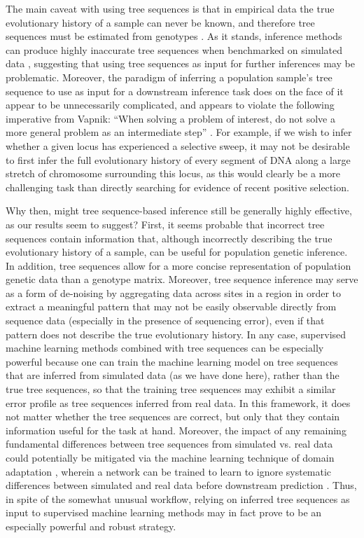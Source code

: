 The main caveat with using tree sequences is that in empirical data the true evolutionary history of a sample can never be known, and therefore tree sequences must be estimated from genotypes \cite{kelleherInferringWholegenomeHistories2019,mahmoudiBayesianInferenceAncestral2022}. As it stands, inference methods can produce highly inaccurate tree sequences when benchmarked on simulated data \cite{zhangBiobankscaleInferenceAncestral2023a}, suggesting that using tree sequences as input for further inferences may be problematic. Moreover, the paradigm of inferring a population sample's tree sequence to use as input for a downstream inference task does on the face of it appear to be unnecessarily complicated, and appears to violate the following imperative from Vapnik: “When solving a problem of interest, do not solve a more general problem as an intermediate step” \cite{vapnikEstimationDependencesBased2006}. For example, if we wish to infer whether a given locus has experienced a selective sweep, it may not be desirable to first infer the full evolutionary history of every segment of DNA along a large stretch of chromosome surrounding this locus, as this would clearly be a more challenging task than directly searching for evidence of recent positive selection.

Why then, might tree sequence-based inference still be generally highly effective, as our results seem to suggest? First, it seems probable that incorrect tree sequences contain information that, although incorrectly describing the true evolutionary history of a sample, can be useful for population genetic inference. In addition, tree sequences allow for a more concise representation of population genetic data than a genotype matrix. Moreover, tree sequence inference may serve as a form of de-noising by aggregating data across sites in a region in order to extract a meaningful pattern that may not be easily observable directly from sequence data (especially in the presence of sequencing error), even if that pattern does not describe the true evolutionary history. In any case, supervised machine learning methods combined with tree sequences can be especially powerful because one can train the machine learning model on tree sequences that are inferred from simulated data (as we have done here), rather than the true tree sequences, so that the training tree sequences may exhibit a similar error profile as tree sequences inferred from real data. In this framework, it does not matter whether the tree sequences are correct, but only that they contain information useful for the task at hand. Moreover, the impact of any remaining fundamental differences between tree sequences from simulated vs. real data could potentially be mitigated via the machine learning technique of domain adaptation \cite{ganinUnsupervisedDomainAdaptation2015}, wherein a network can be trained to learn to ignore systematic differences between simulated and real data before downstream prediction \cite{moDomainadaptiveNeuralNetworks2023a}. Thus, in spite of the somewhat unusual workflow, relying on inferred tree sequences as input to supervised machine learning methods may in fact prove to be an especially powerful and robust strategy.

